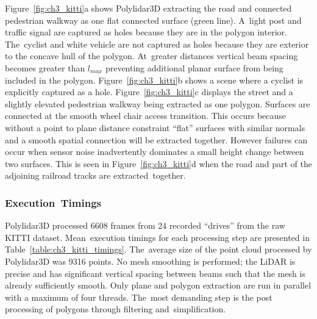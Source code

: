 Figure~\ref{fig:ch3_kitti}a shows Polylidar3D extracting the road and connected pedestrian walkway as one flat connected surface (green line). A~light post and traffic signal are captured as holes because they are in the polygon interior. The~cyclist and white vehicle are not captured as holes because they are exterior to the concave hull of the polygon. At~greater distances vertical beam spacing becomes greater than $l_{max}$ preventing additional planar surface from being included in the polygon. Figure~\ref{fig:ch3_kitti}b shows a scene where a cyclist is explicitly captured as a hole. 
Figure~\ref{fig:ch3_kitti}c displays the street and a slightly elevated pedestrian walkway being extracted as one polygon. Surfaces are connected at the smooth wheel chair access transition. This occurs because without a point to plane distance constraint ``flat'' surfaces with similar normals and a smooth spatial connection will be extracted together.  However failures can occur when sensor noise inadvertently dominates a small height change between two surfaces. This is seen in Figure~\ref{fig:ch3_kitti}d when the road and part of the adjoining railroad tracks are extracted~together. 


\subsubsection{Execution~Timings}\label{sec:ch3_results_kitti_exec}

Polylidar3D processed 6608 frames from 24 recorded ``drives'' from the raw KITTI dataset. Mean~execution timings for each processing step are presented in Table~\ref{table:ch3_kitti_timings}.  The~average size of the point cloud processed by Polylidar3D was 9316 points. No mesh smoothing is performed; the LiDAR is precise and has significant vertical spacing between beams such that the mesh is already sufficiently smooth. Only plane and polygon extraction are run in parallel with a maximum of four threads. The~most demanding step is the post processing of polygons through filtering and~simplification. 


